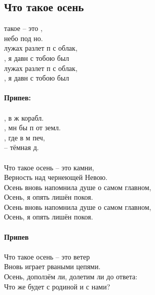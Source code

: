 \documentclass[fleqn,a5paper,12pt,twoside]{guitartabs}
\begin{document}
\subsection*{Что такое осень}
     такое  -- это ,  \\
     небо под но.  \\
     лужах разлет п с облак,\\
    , я давн с тобою  был\\
     лужах разлет п с облак,\\
    , я давн с тобою  был\\
    \\
    \-\hspace{10mm}\textbf{Припев:}\\
    \\
    \-\hspace{10mm}, в  ж корабл.\\
    \-\hspace{10mm}, мн бы п от земл.\\   
    \-\hspace{10mm}, где в м  печ,\\
    \-\hspace{10mm} -- тёмная д.\\
    \\
\newpage
    Что такое осень -- это камни,\\
    Верность над чернеющей Невою.\\
    Осень вновь напомнила душе о самом главном,\\
    Осень, я опять лишён покоя.\\
    Осень вновь напомнила душе о самом главном,\\
    Осень, я опять лишён покоя.  \\
    \\
    \-\hspace{10mm}\textbf{Припев}\\
    \\
    Что такое осень -- это ветер\\
    Вновь играет рваными цепями.\\
    Осень, доползём ли, долетим ли до ответа:\\
    Что же будет с родиной и с нами?\\
\end{document}
